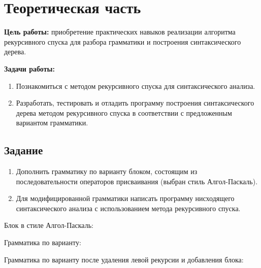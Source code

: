 \chapter{Теоретическая часть}

\textbf{Цель работы:} приобретение практических навыков реализации алгоритма рекурсивного спуска для разбора грамматики и построения синтаксического дерева.

\textbf{Задачи работы:}

\begin{enumerate}
	\item Познакомиться с методом рекурсивного спуска для синтаксического анализа.
	\item Разработать, тестировать и отладить программу построения синтаксического дерева методом рекурсивного спуска в соответствии с предложенным вариантом грамматики.
\end{enumerate}

\section{Задание}

\begin{enumerate}
	\item Дополнить грамматику по варианту блоком, состоящим из последовательности операторов присваивания (выбран стиль Алгол-Паскаль).
	\item Для модифицированной грамматики написать программу нисходящего синтаксического анализа с использованием метода рекурсивного спуска.
\end{enumerate}

Блок в стиле Алгол-Паскаль:
   

\newpage

Грамматика по варианту:


\newpage

Грамматика по варианту после удаления левой рекурсии и добавления блока:

